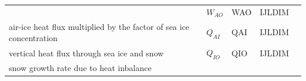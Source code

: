 \begin{longtable}[]{@{}lllll@{}}
\begin{minipage}[t]{0.55\columnwidth}
\end{minipage} & \begin{minipage}[t]{0.08\columnwidth}\raggedright
\(W_{AO}\)\strut
\end{minipage} & \begin{minipage}[t]{0.06\columnwidth}\raggedright
WAO\strut
\end{minipage} & \begin{minipage}[t]{0.13\columnwidth}\raggedright
IJLDIM\strut
\end{minipage} & \begin{minipage}[t]{0.04\columnwidth}\raggedright
\strut
\end{minipage}\tabularnewline
\begin{minipage}[t]{0.55\columnwidth}\raggedright
air-ice heat flux multiplied by the factor of sea ice
concentration\strut
\end{minipage} & \begin{minipage}[t]{0.08\columnwidth}\raggedright
\(Q_{AI}\)\strut
\end{minipage} & \begin{minipage}[t]{0.06\columnwidth}\raggedright
QAI\strut
\end{minipage} & \begin{minipage}[t]{0.13\columnwidth}\raggedright
IJLDIM\strut
\end{minipage} & \begin{minipage}[t]{0.04\columnwidth}\raggedright
\strut
\end{minipage}\tabularnewline
\begin{minipage}[t]{0.55\columnwidth}\raggedright
vertical heat flux through sea ice and snow\strut
\end{minipage} & \begin{minipage}[t]{0.08\columnwidth}\raggedright
\(Q_{IO}\)\strut
\end{minipage} & \begin{minipage}[t]{0.06\columnwidth}\raggedright
QIO\strut
\end{minipage} & \begin{minipage}[t]{0.13\columnwidth}\raggedright
IJLDIM\strut
\end{minipage} & \begin{minipage}[t]{0.04\columnwidth}\raggedright
\strut
\end{minipage}\tabularnewline
\begin{minipage}[t]{0.55\columnwidth}\raggedright
snow growth rate due to heat inbalance\strut
\end{minipage} & \begin{minipage}[t]{0.08\columnwidth}\raggedright

\end{minipage}
\end{longtable}

